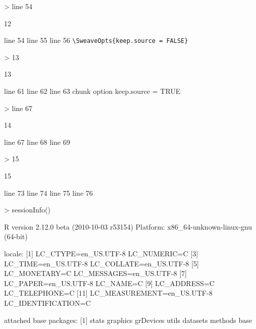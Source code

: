 \documentclass[english, a4paper, 10pt, headings=small, DIV11]{scrartcl}
\begin{document}
\begin{Schunk}
\begin{Sinput}
> line 54 
\end{Sinput}
\begin{Soutput}
[1] 12
\end{Soutput}
\end{Schunk}
line 54 
line 55 
line 56 
\verb+\SweaveOpts{keep.source = FALSE}+
\begin{Schunk}
\begin{Sinput}
> 13
\end{Sinput}
\begin{Soutput}
[1] 13
\end{Soutput}
\end{Schunk}
line 61 
line 62
line 63 chunk option keep.source = TRUE
\begin{Schunk}
\begin{Sinput}
> line 67
\end{Sinput}
\begin{Soutput}
[1] 14
\end{Soutput}
\end{Schunk}
line 67
line 68
line 69
\begin{Schunk}
\begin{Sinput}
> 15
\end{Sinput}
\begin{Soutput}
[1] 15
\end{Soutput}
\end{Schunk}
line 73
line 74
line 75
line 76
\begin{Schunk}
\begin{Sinput}
> sessionInfo()
\end{Sinput}
\begin{Soutput}
R version 2.12.0 beta (2010-10-03 r53154)
Platform: x86_64-unknown-linux-gnu (64-bit)

locale:
 [1] LC_CTYPE=en_US.UTF-8       LC_NUMERIC=C              
 [3] LC_TIME=en_US.UTF-8        LC_COLLATE=en_US.UTF-8    
 [5] LC_MONETARY=C              LC_MESSAGES=en_US.UTF-8   
 [7] LC_PAPER=en_US.UTF-8       LC_NAME=C                 
 [9] LC_ADDRESS=C               LC_TELEPHONE=C            
[11] LC_MEASUREMENT=en_US.UTF-8 LC_IDENTIFICATION=C       

attached base packages:
[1] stats     graphics  grDevices utils     datasets  methods   base     
\end{Soutput}
\end{Schunk}
\end{document}
